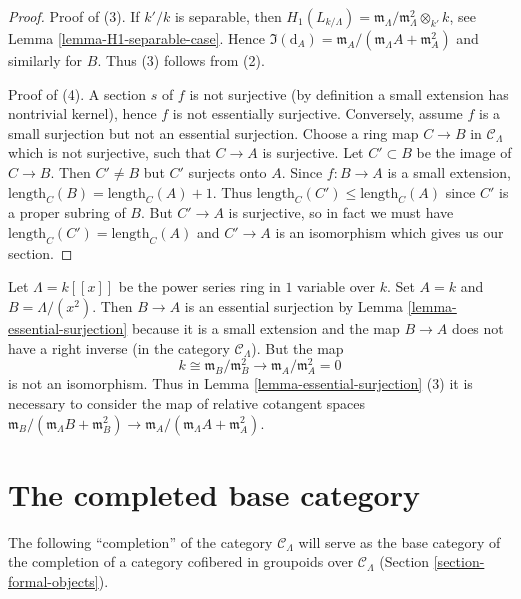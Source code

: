 \begin{proof}
\medskip\noindent
Proof of (3). If $k'/k$ is separable, then
$H_1(L_{k/\Lambda}) =
\mathfrak m_\Lambda/\mathfrak m_\Lambda^2 \otimes_{k'} k$, see
Lemma \ref{lemma-H1-separable-case}.
Hence $\Im(\text{d}_A) =
\mathfrak m_A/(\mathfrak m_\Lambda A + \mathfrak m_A^2)$
and similarly for $B$. Thus (3) follows from (2).

\medskip\noindent
Proof of (4). A section $s$ of $f$ is not surjective (by definition a
small extension has nontrivial kernel), hence $f$ is not essentially
surjective. Conversely, assume $f$ is a small surjection but not an
essential surjection. Choose a ring map $C \to B$ in $\mathcal{C}_\Lambda$
which is not surjective, such that $C \to A$ is surjective. Let
$C' \subset B$ be the image of $C \to B$. Then $C' \not = B$ but
$C'$ surjects onto $A$. Since $f : B \to A$ is a small extension,
$\text{length}_C(B) = \text{length}_C(A) + 1$. Thus
$\text{length}_C(C') \leq \text{length}_C(A)$ since
$C'$ is a proper subring of $B$. But $C' \to A$ is surjective, so in
fact we must have $\text{length}_C(C') = \text{length}_C(A)$ and
$C' \to A$ is an isomorphism which gives us our section.
\end{proof}

\begin{example}
\label{example-essential-surjection}
Let $\Lambda = k[[x]]$ be the power series ring in $1$ variable over $k$.
Set $A = k$ and $B = \Lambda/(x^2)$. Then $B \to A$ is an essential
surjection by
Lemma \ref{lemma-essential-surjection}
because it is a small extension and the map $B \to A$ does not have a
right inverse (in the category $\mathcal{C}_\Lambda$). But the map
$$
k \cong \mathfrak m_B/\mathfrak m_B^2
\longrightarrow
\mathfrak m_A/\mathfrak m_A^2 = 0
$$
is not an isomorphism. Thus in
Lemma \ref{lemma-essential-surjection} (3)
it is necessary to consider the map of relative cotangent spaces
$\mathfrak m_B/(\mathfrak m_\Lambda B + \mathfrak m_B^2) \to
\mathfrak m_A/(\mathfrak m_\Lambda A + \mathfrak m_A^2)$.
\end{example}







\section{The completed base category}
\label{section-category-completion-CLambda}

\noindent
The following ``completion'' of the category $\mathcal{C}_\Lambda$ will serve
as the base category of the completion of a category cofibered in groupoids
over $\mathcal{C}_\Lambda$
(Section \ref{section-formal-objects}).

